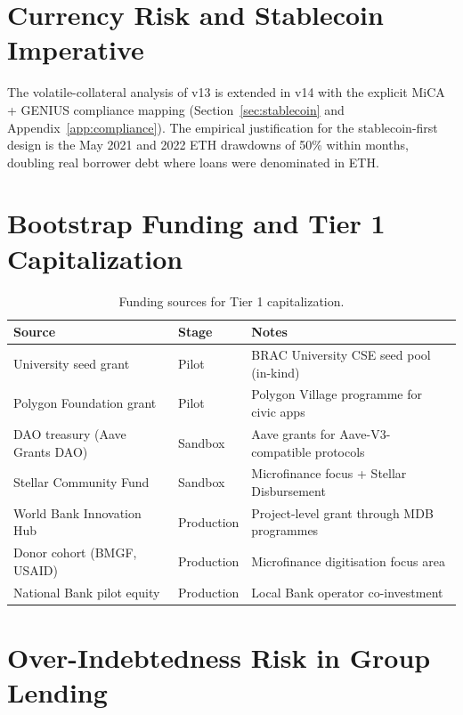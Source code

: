 \documentclass[12pt,a4paper]{report}
\begin{document}
\section{Currency Risk and Stablecoin Imperative}
\label{sec:currency}
The volatile-collateral analysis of v13 is extended in v14 with the explicit MiCA + GENIUS compliance mapping (Section~\ref{sec:stablecoin} and Appendix~\ref{app:compliance}). The empirical justification for the stablecoin-first design is the May 2021 and 2022 ETH drawdowns of 50\% within months, doubling real borrower debt where loans were denominated in ETH.

\section{Bootstrap Funding and Tier 1 Capitalization}
\label{sec:bootstrap}

\begin{table}[!t]
\centering
\caption{Funding sources for Tier 1 capitalization.}
\label{tab:funding}
\small
\begin{tabularx}{\linewidth}{@{}p{3.6cm}p{2.6cm}Y@{}}
\toprule
\textbf{Source} & \textbf{Stage} & \textbf{Notes} \\
\midrule
University seed grant & Pilot & BRAC University CSE seed pool (in-kind) \\
Polygon Foundation grant & Pilot & Polygon Village programme for civic apps \\
DAO treasury (Aave Grants DAO) & Sandbox & Aave grants for Aave-V3-compatible protocols \\
Stellar Community Fund~\cite{stellar2025report} & Sandbox & Microfinance focus + Stellar Disbursement \\
World Bank Innovation Hub & Production & Project-level grant through MDB programmes \\
Donor cohort (BMGF, USAID) & Production & Microfinance digitisation focus area \\
National Bank pilot equity & Production & Local Bank operator co-investment \\
\bottomrule
\end{tabularx}
\end{table}

\section{Over-Indebtedness Risk in Group Lending}
\label{sec:over-indebt}
\end{document}

